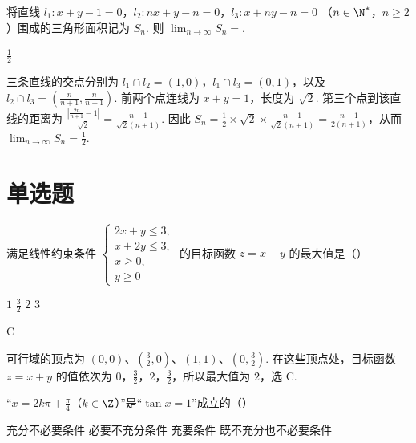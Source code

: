 \begin{problem}
将直线 \(l_1: x + y - 1 = 0\)，\(l_2: nx + y - n = 0\)，\(l_3: x + ny - n = 0\) （\(n \in \N^*\)，\(n \geqslant 2\)）围成的三角形面积记为 \(S_n\). 则 \(\displaystyle\lim_{n \to \infty} S_n = \)\fillinblank{}.
\end{problem}

\begin{answer}
\(\frac{1}{2}\)
\end{answer}

\begin{solution}
三条直线的交点分别为
\(l_1\cap l_2=(1,0)\)，\(l_1\cap l_3=(0,1)\)，以及
\(l_2\cap l_3=\left(\frac{n}{n+1},\frac{n}{n+1}\right)\).
前两个点连线为 \(x+y=1\)，长度为 \(\sqrt2\). 第三个点到该直线的距离为
\(\frac{\left|\frac{2n}{n+1}-1\right|}{\sqrt2}=\frac{n-1}{\sqrt2(n+1)}\).
因此
\(S_n=\frac12\times\sqrt2\times\frac{n-1}{\sqrt2(n+1)}=\frac{n-1}{2(n+1)}\)，从而 \(\lim_{n\to\infty}S_n=\frac12\).
\end{solution}

\section{单选题}

\begin{problem}
满足线性约束条件 \(\begin{cases}
2x + y \leqslant 3,\\
x + 2y \leqslant 3,\\
x \geqslant 0,\\
y \geqslant 0
\end{cases}\) 的目标函数 \(z = x + y\) 的最大值是（\quad）

\choices
    {\(1\)}
    {\(\frac{3}{2}\)}
    {\(2\)}
    {\(3\)}
\end{problem}

\begin{answer}
C
\end{answer}

\begin{solution}
可行域的顶点为 \((0,0)\)、\((\frac32,0)\)、\((1,1)\)、\((0,\frac32)\). 在这些顶点处，目标函数 \(z=x+y\) 的值依次为 \(0\)，\(\frac32\)，\(2\)，\(\frac32\)，所以最大值为 \(2\)，选 C.
\end{solution}

\begin{problem}
“\(x = 2k\pi + \frac{\pi}{4}\)（\(k \in \Z\)）”是“\(\tan x = 1\)”成立的（\quad）

\choices
    {充分不必要条件}
    {必要不充分条件}
    {充要条件}
    {既不充分也不必要条件}
\end{problem}

